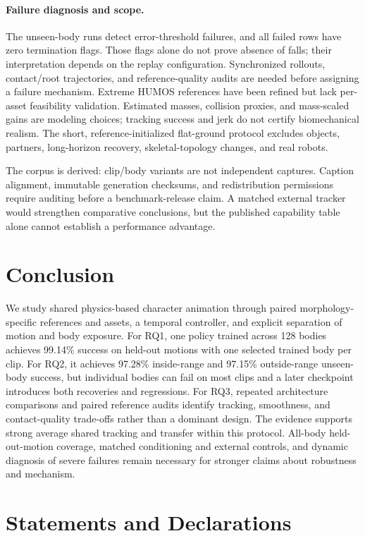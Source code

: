 \documentclass[11pt]{article}
\begin{document}
\paragraph{Failure diagnosis and scope.}
The unseen-body runs detect error-threshold failures, and all failed rows have zero termination flags. Those flags alone do not
prove absence of falls; their interpretation depends on the replay
configuration. Synchronized rollouts, contact/root trajectories, and reference-quality
audits are needed before assigning a failure mechanism. Extreme HUMOS
references have been refined but lack per-asset feasibility validation.
Estimated masses, collision proxies, and mass-scaled gains are modeling
choices; tracking success and jerk do not certify biomechanical realism.
The short, reference-initialized flat-ground protocol excludes objects,
partners, long-horizon recovery, skeletal-topology changes, and real robots.

The corpus is derived: clip/body variants are not independent captures.
Caption alignment, immutable generation checksums, and redistribution
permissions require auditing before a benchmark-release claim. A matched
external tracker would strengthen comparative conclusions, but the published
capability table alone cannot establish a performance advantage.

\section{Conclusion}\label{sec:conclusion}
We study shared physics-based character animation through paired morphology-specific
references and assets, a temporal controller, and explicit separation of
motion and body exposure. For RQ1, one policy trained across 128 bodies
achieves 99.14\% success on held-out motions with one selected trained body
per clip. For RQ2, it achieves 97.28\% inside-range and 97.15\% outside-range
unseen-body success, but individual bodies can fail on most clips and a later
checkpoint introduces both recoveries and regressions. For RQ3, repeated
architecture comparisons and paired reference audits identify tracking,
smoothness, and contact-quality trade-offs rather than a dominant design.
The evidence supports strong average shared tracking and transfer within
this protocol. All-body held-out-motion coverage, matched conditioning and
external controls, and dynamic diagnosis of severe failures remain necessary
for stronger claims about robustness and mechanism.


\section*{Statements and Declarations}
\end{document}
